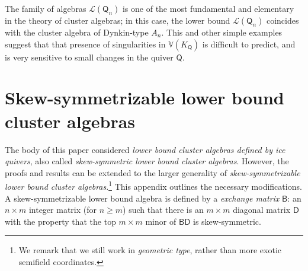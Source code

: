 \documentclass[10pt]{amsart}
\numberwithin{equation}{section}
\theoremstyle{definition}
\theoremstyle{remark}
\newcommand{\B}{\mathcal{B}}
\renewcommand{\L}{\mathcal{L}}%
\newcommand{\1}{^{-1}}
\def\Q{\mathsf{Q}}
\begin{document}
The family of algebras $\L(\Q_n)$ is one of the most fundamental and elementary in the theory of cluster algebras; in this case, the lower bound $\L(\Q_n)$ coincides with the cluster algebra of Dynkin-type $A_n$.  This and other simple examples suggest that that presence of singularities in $\mathbb{V}(K_{\Q})$ is difficult to predict, and is very sensitive to small changes in the quiver $\Q$.

\section{Skew-symmetrizable lower bound cluster algebras}\label{section: skew}

\def\B{\mathsf{B}}

The body of this paper considered \emph{lower bound cluster algebras defined by ice quivers}, also called \emph{skew-symmetric lower bound cluster algebras}.  However, the proofs and results can be extended to the larger generality of \emph{skew-symmetrizable lower bound cluster algebras}.\footnote{We remark that we still work in \emph{geometric type}, rather than more exotic semifield coordinates.}  This appendix outlines the necessary modifications.  
A skew-symmetrizable lower bound algebra is defined by a \textit{exchange matrix} $\B$: an $n\times m$ integer matrix (for $n\geq m$) such that there is an $m\times m$ diagonal matrix $\mathsf{D}$ with the property that the top $m\times m$ minor of $\B\mathsf{D}$ is skew-symmetric.
\end{document}
